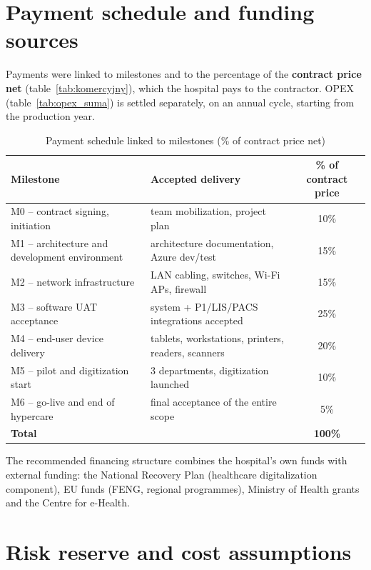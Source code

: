 \section{Payment schedule and funding sources}

Payments were linked to milestones and to the percentage of the \textbf{contract price net} (table~\ref{tab:komercyjny}), which the hospital pays to the contractor. OPEX (table~\ref{tab:opex_suma}) is settled separately, on an annual cycle, starting from the production year.

\begin{table}[h]
\centering
\small
\renewcommand{\arraystretch}{1.2}
\begin{tabular}{|L{5.5cm}|L{5.5cm}|c|}
\hline
{}\textbf{Milestone} & \textbf{Accepted delivery} & \textbf{\% of contract price} \\
\hline
M0 -- contract signing, initiation & team mobilization, project plan & 10\% \\
\hline
M1 -- architecture and development environment & architecture documentation, Azure dev/test & 15\% \\
\hline
M2 -- network infrastructure & LAN cabling, switches, Wi-Fi APs, firewall & 15\% \\
\hline
M3 -- software UAT acceptance & system + P1/LIS/PACS integrations accepted & 25\% \\
\hline
M4 -- end-user device delivery & tablets, workstations, printers, readers, scanners & 20\% \\
\hline
M5 -- pilot and digitization start & 3 departments, digitization launched & 10\% \\
\hline
M6 -- go-live and end of hypercare & final acceptance of the entire scope & 5\% \\
\hline
{}\textbf{Total} & & \textbf{100\%} \\
\hline
\end{tabular}
\caption{Payment schedule linked to milestones (\% of contract price net)}
\label{tab:platnosci}
\end{table}

The recommended financing structure combines the hospital's own funds with external funding: the National Recovery Plan (healthcare digitalization component), EU funds (FENG, regional programmes), Ministry of Health grants and the Centre for e-Health.

\section{Risk reserve and cost assumptions}

